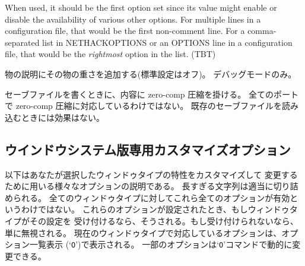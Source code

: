 When used, it should be the first option set since its value might
enable or disable the availability of various other options.
For multiple lines in a configuration file, that would be the first
non-comment line.
For a comma-separated list in NETHACKOPTIONS or an OPTIONS line in a
configuration file, that would be the {\it rightmost\/} option in the list.
(TBT)
\item[\ib{wizweight}]
物の説明にその物の重さを追加する(標準設定はオフ)。
デバッグモードのみ。
\item[\ib{zerocomp}]
セーブファイルを書くときに、内容に zero-comp 圧縮を掛ける。
全てのポートで zero-comp 圧縮に対応しているわけではない。
既存のセーブファイルを読み込むときには効果はない。
\elist

\subsection*{ウインドウシステム版専用カスタマイズオプション}

以下はあなたが選択したウィンドゥタイプの特性をカスタマイズして
変更するために用いる様々なオプションの説明である。
長すぎる文字列は適当に切り詰められる。
全てのウィンドゥタイプに対してこれら全てのオプションが有効というわけではない。
これらのオプションが設定されたとき、もしウィンドゥタイプがその設定を
受け付けるなら、そうされる。もし受け付けられないなら、単に無視される。
現在のウィンドゥタイプで対応しているオプションは、オプション一覧表示
(`{\tt O}')で表示される。
一部のオプションは`{\tt O}'コマンドで動的に変更できる。

